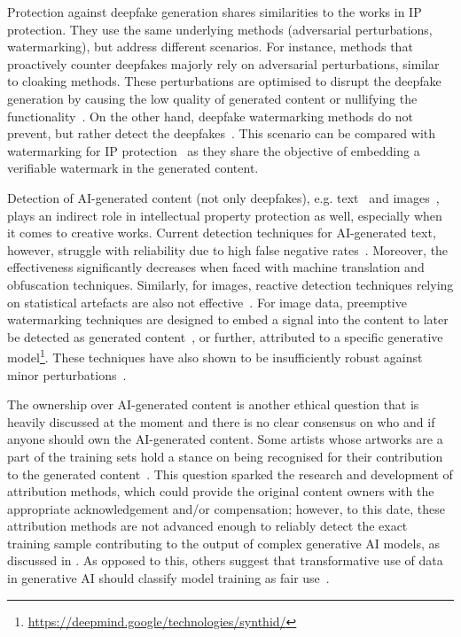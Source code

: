Protection against deepfake generation shares similarities to the works in IP protection. 
They use the same underlying methods (adversarial perturbations, watermarking), but address different scenarios.
For instance, methods that proactively counter deepfakes majorly rely on adversarial perturbations, similar to cloaking methods. 
These perturbations are optimised to disrupt the deepfake generation by causing the low quality of generated content or nullifying the functionality~\cite{ruiz_disrupting_2020,dong_restricted_2023,ruiz_practical_2023}. 
On the other hand, deepfake watermarking methods do not prevent, but rather detect the deepfakes~\cite{wang_faketagger_2021,wu_sepmark_2023}. 
This scenario can be compared with watermarking for IP protection~\cite{lederer_identifying_2023} as they share the objective of embedding a verifiable watermark in the generated content.


Detection of AI-generated content (not only deepfakes), e.g. text~\cite{noauthor_science_2024} and images~\cite{liu_detecting_2022}, plays an indirect role in intellectual property protection as well, especially when it comes to creative works. 
Current detection techniques for AI-generated text, however, struggle with reliability due to high false negative rates~\cite{sadasivan_can_2024,weber-wulff_testing_2023}. 
Moreover, the effectiveness significantly decreases when faced with machine translation and obfuscation techniques.
Similarly, for images, reactive detection techniques relying on statistical artefacts are also not effective~\cite{corvi_detection_2023}.
For image data, preemptive watermarking techniques are designed to embed a signal into the content to later be detected as generated content~\cite{zhu_hidden_2018,zhang_udh_2020}, or further, attributed to a specific generative model\footnote{\url{https://deepmind.google/technologies/synthid/}}.
These techniques have also shown to be insufficiently robust against minor perturbations~\cite{jiang_evading_2023}.


The ownership over AI-generated content is another ethical question that is heavily discussed at the moment and there is no clear consensus on who and if anyone should own the AI-generated content. 
Some artists whose artworks are a part of the training sets hold a stance on being recognised for their contribution to the generated content~\cite{koziol_stable_2023}. 
This question sparked the research and development of attribution methods, which could provide the original content owners with the appropriate acknowledgement and/or compensation; however, to this date, these attribution methods are not advanced enough to reliably detect the exact training sample contributing to the output of complex generative AI models, as discussed in . 
As opposed to this, others suggest that transformative use of data in generative AI should classify model training as fair use~\cite{lemley_fair_2021}.   

